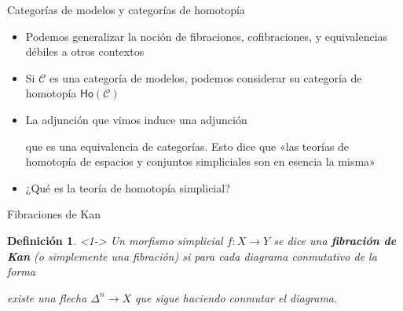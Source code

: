 \documentclass[11pt]{beamer}
\newcommand{\cat}[1]{\mathsf{#1}}
\renewcommand{\ss}[1]{\Delta^{#1}}
\newcommand{\horn}[2]{\Lambda^{#1}_{#2}}
\newcommand{\guill}[1]{«#1»}
\newtheorem{defs}{Definición}
\begin{document}
\begin{frame}{Categorías de modelos y categorías de homotopía}
\begin{itemize}
\item Podemos generalizar la noción de fibraciones, cofibraciones, y equivalencias débiles a otros contextos
\item <2-> Si $\mathscr{C}$ es una categoría de modelos, podemos considerar su categoría de homotopía $\cat{Ho}(\mathscr{C})$
\item <3-> 	La adjunción que vimos induce una adjunción
\begin{center}
\end{center}
que es una equivalencia de categorías. Esto dice que \guill{las teorías de homotopía de espacios y conjuntos simpliciales son en esencia la misma}
\item <4-> ¿Qué es la teoría de homotopía simplicial?
\end{itemize}
\end{frame}

\begin{frame}{Fibraciones de Kan}
\begin{defs} <1-> Un morfismo simplicial $f : X \to Y$ se dice una \textbf{fibración de Kan} (o simplemente una fibración) si para cada diagrama conmutativo de la forma
\begin{center}
\end{center}
existe una flecha $\ss{n} \to X$ que sigue haciendo conmutar el diagrama.
\end{defs}
\end{frame}
\end{document}
